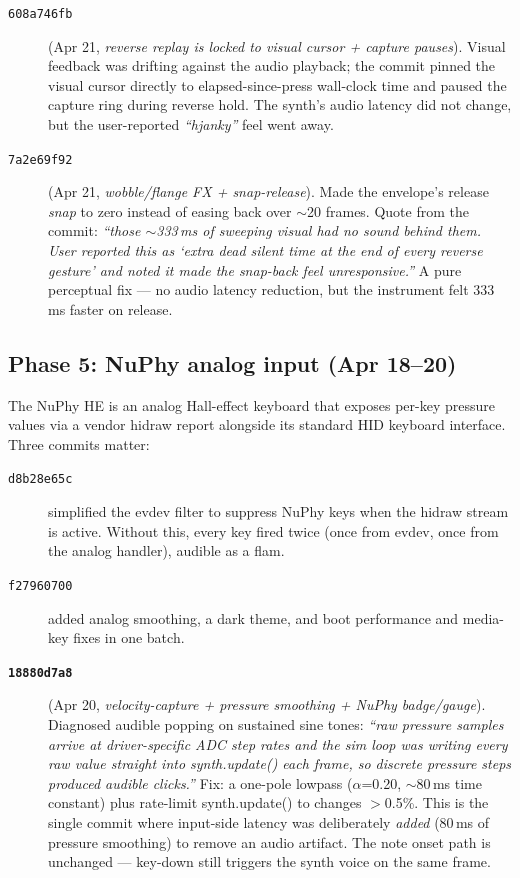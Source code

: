 \documentclass[10pt,letterpaper,twocolumn]{article}
\begin{document}
\begin{description}
\item[\texttt{608a746fb}] (Apr 21, \emph{reverse replay is locked to visual cursor + capture pauses}). Visual feedback was drifting against the audio playback; the commit pinned the visual cursor directly to elapsed-since-press wall-clock time and paused the capture ring during reverse hold. The synth's audio latency did not change, but the user-reported \emph{``hjanky''} feel went away.
\item[\texttt{7a2e69f92}] (Apr 21, \emph{wobble/flange FX + snap-release}). Made the envelope's release \emph{snap} to zero instead of easing back over $\sim$20 frames. Quote from the commit: \emph{``those $\sim$333\,ms of sweeping visual had no sound behind them. User reported this as `extra dead silent time at the end of every reverse gesture' and noted it made the snap-back feel unresponsive.''} A pure perceptual fix --- no audio latency reduction, but the instrument felt 333\,ms faster on release.
\end{description}

\subsection{Phase 5: NuPhy analog input (Apr 18--20)}

The NuPhy HE is an analog Hall-effect keyboard that exposes per-key pressure values via a vendor hidraw report alongside its standard HID keyboard interface. Three commits matter:

\begin{description}
\item[\texttt{d8b28e65c}] simplified the evdev filter to suppress NuPhy keys when the hidraw stream is active. Without this, every key fired twice (once from evdev, once from the analog handler), audible as a flam.
\item[\texttt{f27960700}] added analog smoothing, a dark theme, and boot performance and media-key fixes in one batch.
\item[\textbf{\texttt{18880d7a8}}] (Apr 20, \emph{velocity-capture + pressure smoothing + NuPhy badge/gauge}). Diagnosed audible popping on sustained sine tones: \emph{``raw pressure samples arrive at driver-specific ADC step rates and the sim loop was writing every raw value straight into synth.update() each frame, so discrete pressure steps produced audible clicks.''} Fix: a one-pole lowpass ($\alpha$=0.20, $\sim$80\,ms time constant) plus rate-limit synth.update() to changes $>$0.5\%. This is the single commit where input-side latency was deliberately \emph{added} (80\,ms of pressure smoothing) to remove an audio artifact. The note onset path is unchanged --- key-down still triggers the synth voice on the same frame.
\end{description}
\end{document}
